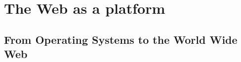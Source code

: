 \section{The Web as a platform} \label{chapter2:web-as-a-platform}

\subsection{From Operating Systems to the World Wide Web}






